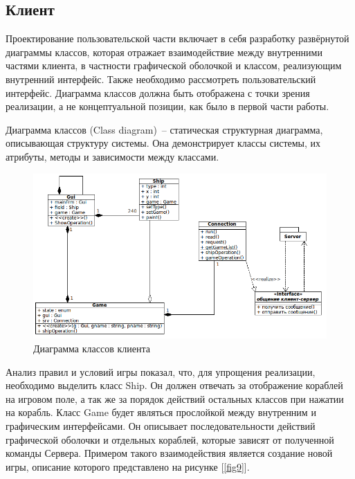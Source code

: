 ﻿\subsection{Клиент}
Проектирование пользовательской части включает в себя разработку развёрнутой диаграммы классов, которая отражает взаимодействие между внутренними частями клиента, в частности графической оболочкой и классом, реализующим внутренний интерфейс. Также необходимо рассмотреть пользовательский интерфейс. Диаграмма классов должна быть отображена с точки зрения реализации, а не концептуальной позиции, как было в первой части работы.

Диаграмма классов (Class diagram)~-- статическая структурная диаграмма, описывающая структуру системы. Она демонстрирует классы системы, их атрибуты, методы и зависимости между классами.

\begin{figure}[ht]
\centering
\includegraphics[width=18cm]{images/class_client.png}
\caption{Диаграмма классов клиента}
\label{fig8}
\end{figure}


Анализ правил и условий игры показал, что, для упрощения реализации, необходимо выделить класс Ship. Он должен отвечать за отображение кораблей на игровом поле, а так же за порядок действий остальных классов при нажатии на корабль.
Класс Game будет являться прослойкой между внутренним и графическим интерфейсами. Он описывает последовательности действий графической оболочки и отдельных кораблей, которые зависят от полученной команды Сервера. Примером такого взаимодействия является создание новой игры, описание которого представлено на рисунке [\ref{fig9}].

